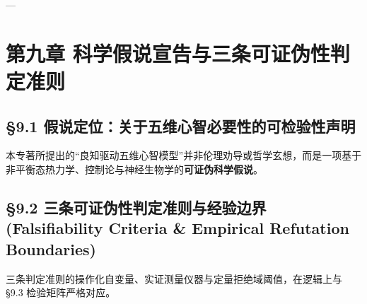 \documentclass[11pt,a4paper,oneside]{ctexart}
\begin{document}
---


\section{第九章 科学假说宣告与三条可证伪性判定准则}

\subsection{§9.1 假说定位：关于五维心智必要性的可检验性声明}

本专著所提出的“良知驱动五维心智模型”并非伦理劝导或哲学玄想，而是一项基于非平衡态热力学、控制论与神经生物学的\textbf{可证伪科学假说}。


\subsection{§9.2 三条可证伪性判定准则与经验边界 (Falsifiability Criteria \& Empirical Refutation Boundaries)}

三条判定准则的操作化自变量、实证测量仪器与定量拒绝域阈值，在逻辑上与 §9.3 检验矩阵严格对应。
\end{document}
